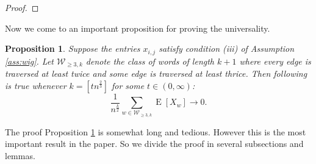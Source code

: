 \documentclass[12pt]{article}
\numberwithin{equation}{section}
\newtheorem{proposition}{Proposition}[section]
\numberwithin{equation}{section}
\theoremstyle{definition}
\DeclareMathOperator{\E}{E} \DeclareMathOperator{\var}{Var}
\renewcommand{\1}{\bf 1}
\begin{document}
\begin{proof}
%
%
% 
\end{proof}
Now we come to an important proposition for proving the universality. 
\begin{proposition}\label{prop:ge3}
Suppose the entries $x_{i,j}$ satisfy condition (iii) of Assumption \ref{ass:wig}. Let $\mathcal{W}_{\ge 3,k}$ denote the class of words of length $k+1$ where every edge is traversed at least twice and some edge is traversed at least thrice. Then following is true whenever $k= [tn^{\frac{2}{3}}]$  for some $t\in (0,\infty)$:
\begin{equation}\label{eq:wigge3}
\frac{1}{n^{\frac{k}{2}}}\sum_{w \in \mathcal{W}_{\ge 3,k}} \E\left[ X_{w} \right]\to 0.
\end{equation}
\end{proposition}
The proof Proposition \ref{prop:ge3} is somewhat long and tedious. However this is the most important result in the paper. So we divide the proof in several subsections and lemmas.
\end{document}
